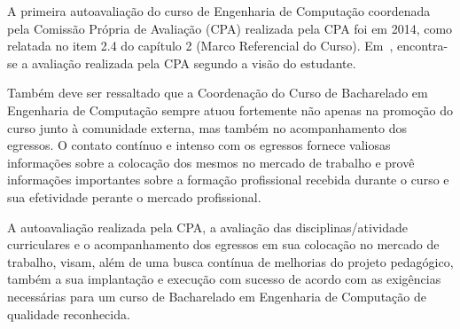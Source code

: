 A primeira autoavaliação do curso de Engenharia de Computação coordenada pela Comissão Própria de Avaliação (CPA) realizada pela CPA foi em 2014, como relatada no item 2.4 do capítulo 2 (Marco Referencial do Curso). Em~\cite{CPA}, encontra-se a avaliação realizada pela CPA segundo a visão do estudante.

Também deve ser ressaltado que a Coordenação do Curso de Bacharelado em Engenharia de Computação sempre atuou fortemente não apenas na promoção do curso junto à comunidade externa, mas também no acompanhamento dos egressos. O contato contínuo e intenso com os egressos fornece valiosas informações sobre a colocação dos mesmos no mercado de trabalho e provê informações importantes sobre a formação profissional recebida durante o curso e sua efetividade perante o mercado profissional.

A autoavaliação realizada pela CPA, a avaliação das disciplinas/atividade curriculares e o acompanhamento dos egressos em sua colocação no mercado de trabalho, visam, além de uma busca contínua de melhorias do projeto pedagógico, também a sua implantação e execução com sucesso de acordo com as exigências necessárias para um curso de Bacharelado em Engenharia de Computação de qualidade reconhecida.

